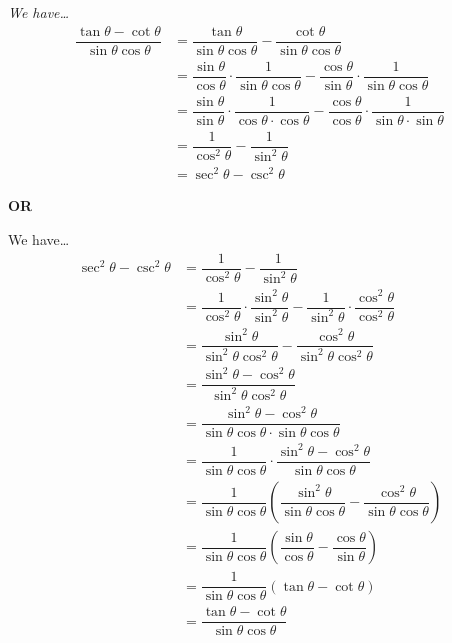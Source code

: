 \documentclass[12pt,letterpaper]{exam}
\begin{document}
\begin{questions}
{\itshape \sol We have\dots
	\[
	\begin{aligned}
	\dfrac{\tan \theta - \cot \theta}{\sin \theta \cos \theta}&= \dfrac{\tan \theta}{\sin \theta \cos \theta} - \dfrac{\cot \theta}{\sin \theta \cos \theta} \\[0.3cm]
	&= \dfrac{\sin \theta}{\cos \theta} \cdot \dfrac{1}{\sin \theta \cos \theta} - \dfrac{\cos \theta}{\sin \theta} \cdot \dfrac{1}{\sin \theta \cos \theta} \\[0.3cm]
	&= \dfrac{\sin \theta}{\sin \theta} \cdot \dfrac{1}{\cos \theta \cdot \cos \theta} - \dfrac{\cos \theta}{\cos \theta} \cdot \dfrac{1}{\sin \theta \cdot \sin \theta} \\[0.3cm]
	&= \dfrac{1}{\cos^2 \theta} - \dfrac{1}{\sin^2 \theta} \\[0.3cm]
	&= \sec^2 \theta - \csc^2 \theta
	\end{aligned}
	\] 
	\begin{center} {\bfseries OR} \end{center}
We have\dots
	\[
	\begin{aligned}
	\sec^2 \theta - \csc^2\theta&= \dfrac{1}{\cos^2 \theta} - \dfrac{1}{\sin^2 \theta} \\[0.3cm]
	&= \dfrac{1}{\cos^2 \theta} \cdot \dfrac{\sin^2 \theta}{\sin^2 \theta} - \dfrac{1}{\sin^2 \theta} \cdot \dfrac{\cos^2 \theta}{\cos^2 \theta} \\[0.3cm]
	&= \dfrac{\sin^2 \theta}{\sin^2 \theta \cos^2 \theta} - \dfrac{\cos^2 \theta}{\sin^2 \theta \cos^2 \theta} \\[0.3cm]
	&= \dfrac{\sin^2 \theta - \cos^2 \theta}{\sin^2 \theta \cos^2 \theta} \\[0.3cm]
	&= \dfrac{\sin^2 \theta - \cos^2 \theta}{\sin \theta \cos \theta \cdot \sin \theta \cos \theta} \\[0.3cm]
	&= \dfrac{1}{\sin \theta \cos \theta} \cdot \dfrac{\sin^2 \theta - \cos^2 \theta}{\sin \theta \cos \theta} \\[0.3cm]
	&= \dfrac{1}{\sin \theta \cos \theta} \left( \dfrac{\sin^2 \theta}{\sin \theta \cos \theta} - \dfrac{\cos^2 \theta}{\sin \theta \cos \theta} \right) \\[0.3cm]
	&= \dfrac{1}{\sin \theta \cos \theta} \left( \dfrac{\sin \theta}{\cos \theta} - \dfrac{\cos \theta}{\sin \theta} \right) \\[0.3cm]
	&= \dfrac{1}{\sin \theta \cos \theta} \left( \tan \theta - \cot \theta \right) \\[0.3cm]
	&= \dfrac{\tan \theta - \cot \theta}{\sin \theta \cos \theta}
	\end{aligned}
	\]
}




\end{questions}
\end{document}
